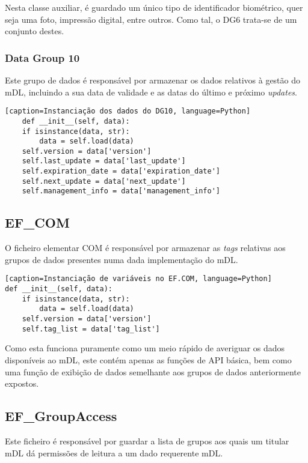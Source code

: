 Nesta classe auxiliar, é guardado um único tipo de identificador biométrico, quer seja uma foto, impressão digital, entre outros. Como tal, o DG6 trata-se de um conjunto destes.

\subsubsection{Data Group 10}

Este grupo de dados é responsável por armazenar os dados relativos à gestão do mDL, incluindo a sua data de validade e as datas do último e próximo \textit{updates}. 

\begin{verbatim}[caption=Instanciação dos dados do DG10, language=Python]
    def __init__(self, data):
    if isinstance(data, str):
        data = self.load(data)
    self.version = data['version']
    self.last_update = data['last_update']
    self.expiration_date = data['expiration_date']
    self.next_update = data['next_update']
    self.management_info = data['management_info']
\end{verbatim}

\subsection{EF_COM}

O ficheiro elementar COM é responsável por armazenar as \textit{tags} relativas aos grupos de dados presentes numa dada implementação do mDL.

\begin{verbatim}[caption=Instanciação de variáveis no EF.COM, language=Python]
def __init__(self, data):
    if isinstance(data, str):
        data = self.load(data)
    self.version = data['version']
    self.tag_list = data['tag_list']
\end{verbatim}

Como esta funciona puramente como um meio rápido de averiguar os dados disponíveis ao mDL, este contém apenas as funções de API básica, bem como uma função de exibição de dados semelhante aos grupos de dados anteriormente expostos.


\subsection{EF_GroupAccess}

Este ficheiro é responsável por guardar a lista de grupos aos quais um titular mDL dá permissões de leitura a um dado requerente mDL.

